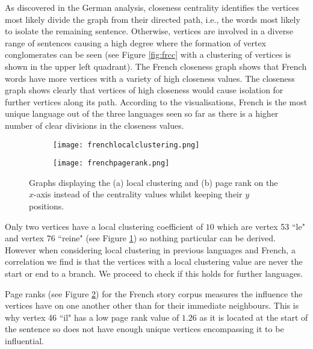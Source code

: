 As discovered in the German analysis, closeness centrality identifies the vertices most likely divide the graph from their directed path, i.e., the words most likely to isolate the remaining sentence. Otherwise, vertices are involved in a diverse range of sentences causing a high degree where the formation of vertex conglomerates can be seen (see Figure \ref{fig:frcc} with a clustering of vertices is shown in the upper left quadrant). The French closeness graph shows that French words have more vertices with a variety of high closeness values. The closeness graph shows clearly that vertices of high closeness would cause isolation for further vertices along its path. According to the visualisations, French is the most unique language out of the three languages seen so far as there is a higher number of clear divisions in the closeness values.

\begin{figure}[!htb]
\centering
\begin{subfigure}{.45\textwidth}
	\hspace{-1cm} 
	\texttt{[image: frenchlocalclustering.png]}
	\caption{}
	\label{fig:frlc}
\end{subfigure}
\hfill
\begin{subfigure}{.45\textwidth}
	\hspace{-1cm} 
	\texttt{[image: frenchpagerank.png]}
	\caption{}
	\label{fig:frpr}
\end{subfigure}
\caption{Graphs displaying the (a) local clustering and (b) page rank on the $x$-axis instead of the centrality values whilst keeping their $y$ positions.}
\label{fig:frother}
\end{figure}

Only two vertices have a local clustering coefficient of $10$ which are vertex 53 ``le" and vertex 76 ``reine" (see Figure \ref{fig:frlc}) so nothing particular can be derived. However when considering local clustering in previous languages and French, a correlation we find is that the vertices with a local clustering value are never the start or end to a branch. We proceed to check if this holds for further languages.

Page ranks (see Figure \ref{fig:frpr}) for the French story corpus measures the influence the vertices have on one another other than for their immediate neighbours. This is why vertex 46 ``il" has a low page rank value of $1.26$ as it is located at the start of the sentence so does not have enough unique vertices encompassing it to be influential.

